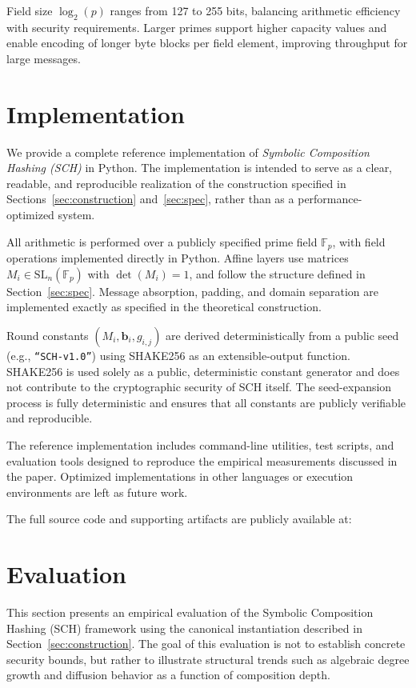 ﻿\documentclass[english]{aucmcs}
\begin{document}
Field size $\log_2(p)$ ranges from 127 to 255 bits, balancing arithmetic efficiency with security requirements. Larger primes support higher capacity values and enable encoding of longer byte blocks per field element, improving throughput for large messages.



\section{Implementation}
\label{sec:implementation}

We provide a complete reference implementation of \emph{Symbolic Composition Hashing (SCH)} in Python. The implementation is intended to serve as a clear, readable, and reproducible realization of the construction specified in Sections~\ref{sec:construction} and~\ref{sec:spec}, rather than as a performance-optimized system.

All arithmetic is performed over a publicly specified prime field $\mathbb{F}_p$, with field operations implemented directly in Python. Affine layers use matrices $M_i \in \mathrm{SL}_n(\mathbb{F}_p)$ with $\det(M_i)=1$, and follow the structure defined in Section~\ref{sec:spec}. Message absorption, padding, and domain separation are implemented exactly as specified in the theoretical construction.

Round constants $(M_i, \mathbf{b}_i, g_{i,j})$ are derived deterministically from a public seed (e.g., \texttt{``SCH-v1.0''}) using SHAKE256 as an extensible-output function. SHAKE256 is used solely as a public, deterministic constant generator and does not contribute to the cryptographic security of SCH itself. The seed-expansion process is fully deterministic and ensures that all constants are publicly verifiable and reproducible.

The reference implementation includes command-line utilities, test scripts, and evaluation tools designed to reproduce the empirical measurements discussed in the paper. Optimized implementations in other languages or execution environments are left as future work.

The full source code and supporting artifacts are publicly available at:



\section{Evaluation}
\label{sec:evaluation}

This section presents an empirical evaluation of the Symbolic Composition Hashing (SCH) framework using the canonical instantiation described in Section~\ref{sec:construction}. The goal of this evaluation is not to establish concrete security bounds, but rather to illustrate structural trends such as algebraic degree growth and diffusion behavior as a function of composition depth.
\end{document}
